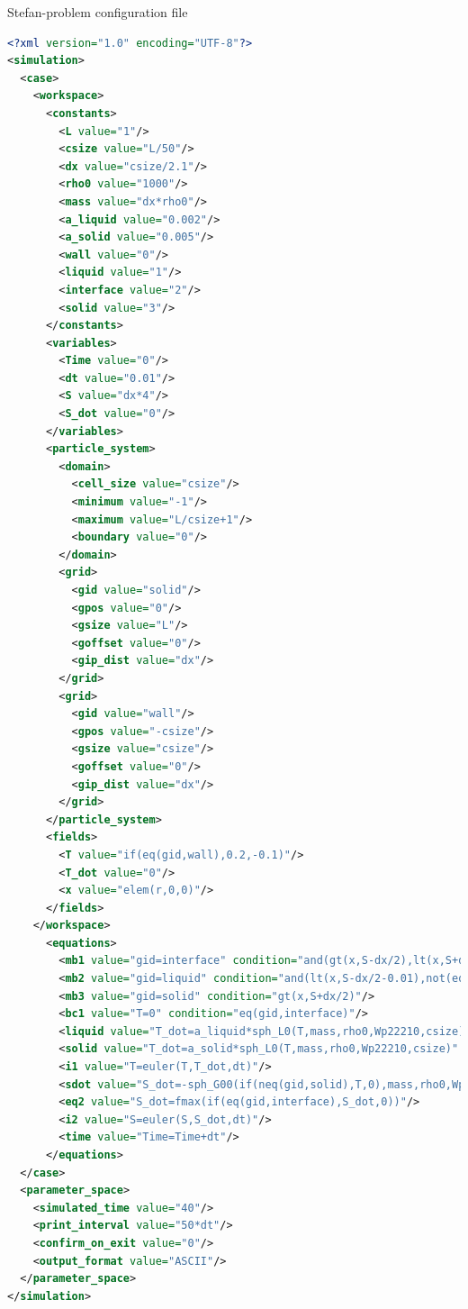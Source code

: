 \documentclass[a4paper,12pt,openany]{book}
\theoremstyle{break}
\begin{document}
\begin{samepage}
\begin{example}{Stefan-problem configuration file}{}
\lstset{basicstyle=\tiny}
\begin{lstlisting}[language=XML]
<?xml version="1.0" encoding="UTF-8"?>
<simulation>
  <case>
    <workspace>
      <constants>
        <L value="1"/>
        <csize value="L/50"/>
        <dx value="csize/2.1"/>
        <rho0 value="1000"/>
        <mass value="dx*rho0"/>
        <a_liquid value="0.002"/>
        <a_solid value="0.005"/>
        <wall value="0"/>
        <liquid value="1"/>
        <interface value="2"/>
        <solid value="3"/>
      </constants>
      <variables>
        <Time value="0"/>
        <dt value="0.01"/>
        <S value="dx*4"/>
        <S_dot value="0"/>
      </variables>
      <particle_system>
        <domain>
          <cell_size value="csize"/>
          <minimum value="-1"/>
          <maximum value="L/csize+1"/>
          <boundary value="0"/>
        </domain>
        <grid>
          <gid value="solid"/>
          <gpos value="0"/>
          <gsize value="L"/>
          <goffset value="0"/>
          <gip_dist value="dx"/>
        </grid>
        <grid>
          <gid value="wall"/>
          <gpos value="-csize"/>
          <gsize value="csize"/>
          <goffset value="0"/>
          <gip_dist value="dx"/>
        </grid>
      </particle_system>
      <fields>
        <T value="if(eq(gid,wall),0.2,-0.1)"/>
        <T_dot value="0"/>
        <x value="elem(r,0,0)"/>
      </fields>
    </workspace>
      <equations>
        <mb1 value="gid=interface" condition="and(gt(x,S-dx/2),lt(x,S+dx/2))"/>
        <mb2 value="gid=liquid" condition="and(lt(x,S-dx/2-0.01),not(eq(gid,wall)))"/>
        <mb3 value="gid=solid" condition="gt(x,S+dx/2)"/>
        <bc1 value="T=0" condition="eq(gid,interface)"/>
        <liquid value="T_dot=a_liquid*sph_L0(T,mass,rho0,Wp22210,csize)" condition="eq(gid,liquid)"/>
        <solid value="T_dot=a_solid*sph_L0(T,mass,rho0,Wp22210,csize)" condition="eq(gid,solid)"/>
        <i1 value="T=euler(T,T_dot,dt)"/>
        <sdot value="S_dot=-sph_G00(if(neq(gid,solid),T,0),mass,rho0,Wp22210,csize)"/>
        <eq2 value="S_dot=fmax(if(eq(gid,interface),S_dot,0))"/>
        <i2 value="S=euler(S,S_dot,dt)"/>
        <time value="Time=Time+dt"/>
      </equations>
  </case>
  <parameter_space>
    <simulated_time value="40"/>
    <print_interval value="50*dt"/>
    <confirm_on_exit value="0"/>
    <output_format value="ASCII"/>
  </parameter_space>
</simulation>
\end{lstlisting}
\end{example}
\end{samepage}
\end{document}
